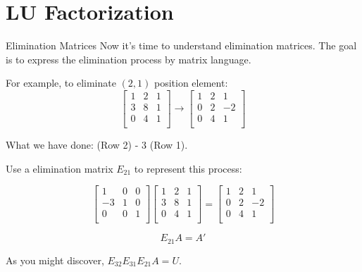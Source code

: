 \documentclass{beamer}
\begin{document}
\section{LU Factorization}
\begin{frame}{Elimination Matrices}
Now it's time to understand elimination matrices. The goal is to express the elimination process by matrix language.

\vspace{3pt}
For example, to eliminate $(2,1)$ position element:
\begin{equation*}
    \left[ \begin{matrix}
        1&		2&		1\\
        3&		8&		1\\
        0&		4&		1\\
    \end{matrix} \right] \rightarrow \left[ \begin{matrix}
        1&		2&		1\\
        0&		2&		-2\\
        0&		4&		1\\
    \end{matrix} \right]
\end{equation*}

What we have done: (Row 2) - 3 (Row 1).

\vspace{3pt}
Use a elimination matrix $E_{21}$ to represent this process:

\begin{equation*}
    \left[ \begin{matrix}
        1&		0&		0\\
        -3&		1&		0\\
        0&		0&		1\\
    \end{matrix} \right] \left[ \begin{matrix}
        1&		2&		1\\
        3&		8&		1\\
        0&		4&		1\\
    \end{matrix} \right] =\left[ \begin{matrix}
        1&		2&		1\\
        0&		2&		-2\\
        0&		4&		1\\
    \end{matrix} \right]
\end{equation*}

\begin{equation*}
    E_{21}A=A'
\end{equation*}

As you might discover, $E_{32}E_{31}E_{21}A=U$.
\end{frame}
\end{document}
